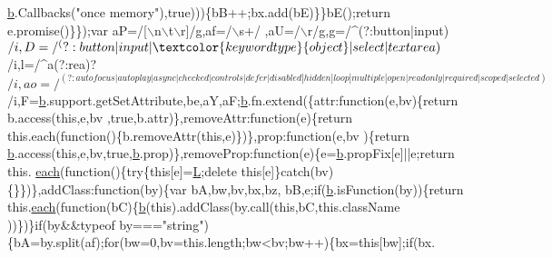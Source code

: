 \begin{DoxyCode}
      \hyperlink{docs_2_programmer's_manual_2html_2jquery_8js_aa4026ad5544b958e54ce5e106fa1c805}{b}.Callbacks(\textcolor{stringliteral}{"once memory"}),\textcolor{keyword}{true})))\{bB++;bx.add(bE)\}\}bE();\textcolor{keywordflow}{return} e.promise()\}\});var aP=/[\(\backslash\)n\(\backslash\)t\(\backslash\)r]/g,af=/\(\backslash\)s+/
      ,aU=/\(\backslash\)r/g,g=/^(?:button|input)$/i,D=/^(?:button|input|\textcolor{keywordtype}{object}|select|textarea)$/i,l=/^a(?:rea)?$/i,ao=/^(?:
      autofocus|autoplay|async|checked|controls|defer|disabled|hidden|loop|multiple|open|readonly|required|scoped|
      selected)$/i,F=\hyperlink{docs_2_programmer's_manual_2html_2jquery_8js_aa4026ad5544b958e54ce5e106fa1c805}{b}.support.getSetAttribute,be,aY,aF;\hyperlink{docs_2_programmer's_manual_2html_2jquery_8js_aa4026ad5544b958e54ce5e106fa1c805}{b}.fn.extend(\{attr:function(e,bv)\{return b.access(this,e,bv
      ,true,b.attr)\},removeAttr:\textcolor{keyword}{function}(e)\{return this.each(function()\{b.removeAttr(this,e)\})\},prop:\textcolor{keyword}{function}(e,bv
      )\{\textcolor{keywordflow}{return} \hyperlink{docs_2_programmer's_manual_2html_2jquery_8js_aa4026ad5544b958e54ce5e106fa1c805}{b}.access(\textcolor{keyword}{this},e,bv,\textcolor{keyword}{true},\hyperlink{docs_2_programmer's_manual_2html_2jquery_8js_aa4026ad5544b958e54ce5e106fa1c805}{b}.prop)\},removeProp:\textcolor{keyword}{function}(e)\{e=\hyperlink{docs_2_programmer's_manual_2html_2jquery_8js_aa4026ad5544b958e54ce5e106fa1c805}{b}.propFix[e]||e;\textcolor{keywordflow}{return} this.
      \hyperlink{docs_2_programmer's_manual_2html_2jquery_8js_a871ff39db627c54c710a3e9909b8234c}{each}(\textcolor{keyword}{function}()\{\textcolor{keywordflow}{try}\{\textcolor{keyword}{this}[e]=\hyperlink{docs_2_programmer's_manual_2html_2jquery_8js_a38ee4c0b5f4fe2a18d0c783af540d253}{L};\textcolor{keyword}{delete} \textcolor{keyword}{this}[e]\}\textcolor{keywordflow}{catch}(bv)\{\}\})\},addClass:\textcolor{keyword}{function}(by)\{var bA,bw,bv,bx,bz,
      bB,e;\textcolor{keywordflow}{if}(\hyperlink{docs_2_programmer's_manual_2html_2jquery_8js_aa4026ad5544b958e54ce5e106fa1c805}{b}.isFunction(by))\{\textcolor{keywordflow}{return} this.\hyperlink{docs_2_programmer's_manual_2html_2jquery_8js_a871ff39db627c54c710a3e9909b8234c}{each}(\textcolor{keyword}{function}(bC)\{\hyperlink{docs_2_programmer's_manual_2html_2jquery_8js_aa4026ad5544b958e54ce5e106fa1c805}{b}(\textcolor{keyword}{this}).addClass(by.call(\textcolor{keyword}{this},bC,\textcolor{keyword}{this}.className
      ))\})\}\textcolor{keywordflow}{if}(by&&typeof by===\textcolor{stringliteral}{"string"})\{bA=by.split(af);\textcolor{keywordflow}{for}(bw=0,bv=this.length;bw<bv;bw++)\{bx=\textcolor{keyword}{this}[bw];\textcolor{keywordflow}{if}(bx.

\end{DoxyCode}
